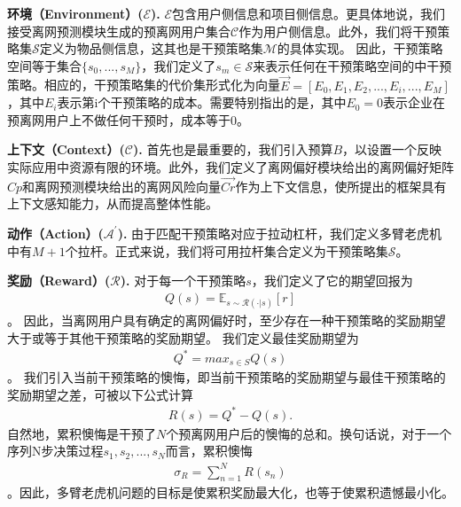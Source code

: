 \par
\textbf{环境（Environment）($\mathcal{E}$).} 
$\mathcal{E}$包含用户侧信息和项目侧信息。更具体地说，我们接受离网预测模块生成的预离网用户集合$\mathcal{C}$作为用户侧信息。此外，我们将干预策略集$\mathcal{S}$定义为物品侧信息，这其也是干预策略集$\mathcal{M}$的具体实现。
因此，干预策略空间等于集合$\{s_{0}, ..., s_{M}\}$，我们定义了$s_{m} \in \mathcal{S}$来表示任何在干预策略空间的中干预策略。相应的，干预策略集的代价集形式化为向量$\vec{E} = [E_{0}, E_{1}, E_{2}, ..., E_{i},..., E_{M}]$，其中$E_{i}$表示第i个干预策略的成本。需要特别指出的是，其中$E_{0} = 0$表示企业在预离网用户上不做任何干预时，成本等于0。 \par
\par

\textbf{上下文（Context）($\mathcal{C}$).} 
首先也是最重要的，我们引入预算$B$，以设置一个反映实际应用中资源有限的环境。此外，我们定义了离网偏好模块给出的离网偏好矩阵$Cp$和离网预测模块给出的离网风险向量$\vec{Cr}$作为上下文信息，使所提出的框架具有上下文感知能力，从而提高整体性能。

\par
\textbf{动作（Action）($\mathcal{A}^{'}$).}
由于匹配干预策略对应于拉动杠杆，我们定义多臂老虎机中有$M+1$个拉杆。正式来说，我们将可用拉杆集合定义为干预策略集$\mathcal{S}$。
\par
\textbf{奖励（Reward）($\mathcal{R}$).}
对于每一个干预策略$s$，我们定义了它的期望回报为
\begin{equation}
	\begin{aligned}
		Q(s) = \mathbb{E}_{s \sim \mathcal{R}(\cdot|s)} [r]
	\end{aligned}
	\label{Eq:Reward-Expectation}
\end{equation} 
。
因此，当离网用户具有确定的离网偏好时，至少存在一种干预策略的奖励期望大于或等于其他干预策略的奖励期望。
我们定义最佳奖励期望为
\begin{equation}
	\begin{aligned}
		Q^{*} = max_{s \in S}Q(s)
	\end{aligned}
	\label{Eq:Best-Reward-Expectation}
\end{equation}	
。
我们引入当前干预策略的懊悔，即当前干预策略的奖励期望与最佳干预策略的奖励期望之差，可被以下公式计算
\begin{equation}
	\begin{aligned}
		R(s) = Q^{*} - Q(s).	
	\end{aligned}
	\label{Eq:Regret}
\end{equation}	  
自然地，累积懊悔是干预了$N$个预离网用户后的懊悔的总和。换句话说，对于一个序列N步决策过程${s_{1}, s_{2}, ..., s_{N}}$而言，累积懊悔
\begin{equation}
	\begin{aligned}
		\sigma_{R} = \sum_{n=1}^{N} R(s_{n})
	\end{aligned}
	\label{Eq:Cumulative-Regrets}
\end{equation}	   
。因此，多臂老虎机问题的目标是使累积奖励最大化，也等于使累积遗憾最小化。
\par	

